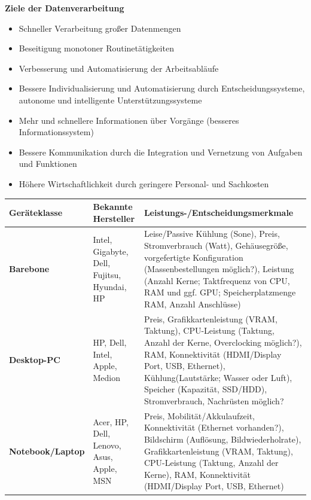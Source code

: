 \documentclass[10pt]{article}
\begin{document}
\begin{flushleft}
\textbf{Ziele der Datenverarbeitung}
\begin{itemize}
    \item   Schneller Verarbeitung großer Datenmengen
    \item   Beseitigung monotoner Routinetätigkeiten
    \item   Verbesserung und Automatisierung der Arbeitsabläufe
    \item   Bessere Individualisierung und Automatisierung durch Entscheidungssysteme, autonome und intelligente Unterstützungssysteme
    \item   Mehr und schnellere Informationen über Vorgänge (besseres Informationssystem)
    \item   Bessere Kommunikation durch die Integration und Vernetzung von Aufgaben und Funktionen
    \item Höhere Wirtschaftlichkeit durch geringere Personal- und Sachkosten
    
\end{itemize}

\begin{longtable}{|l|p{6cm}|p{6cm}|}
    \hline
        \textbf{Geräteklasse} & \textbf{Bekannte Hersteller} & \textbf{Leistungs-/Entscheidungsmerkmale} \\\hline

        \textbf{Barebone} & Intel, Gigabyte, Dell, Fujitsu, Hyundai, HP & Leise/Passive Kühlung (Sone), Preis, Stromverbrauch (Watt), Gehäusegröße, vorgefertigte Konfiguration (Massenbestellungen möglich?), Leistung (Anzahl Kerne; Taktfrequenz von CPU, RAM und ggf. GPU; Speicherplatzmenge RAM, Anzahl Anschlüsse) \\\hline

        \textbf{Desktop-PC} & HP, Dell, Intel, Apple, Medion & Preis, Grafikkartenleistung (VRAM, Taktung), CPU-Leistung (Taktung, Anzahl der Kerne, Overclocking möglich?), RAM, Konnektivität (HDMI/Display Port, USB, Ethernet), Kühlung(Lautstärke; Wasser oder Luft), Speicher (Kapazität, SSD/HDD), Stromverbrauch, Nachrüsten möglich? \\\hline

        \textbf{Notebook/Laptop} & Acer, HP, Dell, Lenovo, Asus, Apple, MSN & Preis, Mobilität/Akkulaufzeit, Konnektivität (Ethernet vorhanden?), Bildschirm (Auflösung, Bildwiederholrate), Grafikkartenleistung (VRAM, Taktung), CPU-Leistung (Taktung, Anzahl der Kerne), RAM, Konnektivität (HDMI/Display Port, USB, Ethernet) \\\hline


\end{longtable}
\end{flushleft}
\end{document}
